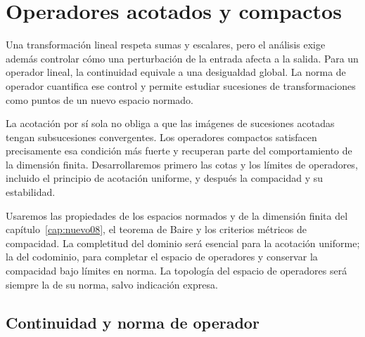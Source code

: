 \chapter{Operadores acotados y compactos}\label{cap:nuevo09}\label{chap:20}\label{chap:23}

Una transformación lineal respeta sumas y escalares, pero el análisis exige además controlar cómo una perturbación de la entrada afecta a la salida. Para un operador lineal, la continuidad equivale a una desigualdad global. La norma de operador cuantifica ese control y permite estudiar sucesiones de transformaciones como puntos de un nuevo espacio normado.

La acotación por sí sola no obliga a que las imágenes de sucesiones acotadas tengan subsucesiones convergentes. Los operadores compactos satisfacen precisamente esa condición más fuerte y recuperan parte del comportamiento de la dimensión finita. Desarrollaremos primero las cotas y los límites de operadores, incluido el principio de acotación uniforme, y después la compacidad y su estabilidad.

Usaremos las propiedades de los espacios normados y de la dimensión finita del capítulo~\ref{cap:nuevo08}, el teorema de Baire y los criterios métricos de compacidad. La completitud del dominio será esencial para la acotación uniforme; la del codominio, para completar el espacio de operadores y conservar la compacidad bajo límites en norma. La topología del espacio de operadores será siempre la de su norma, salvo indicación expresa.

\section{Continuidad y norma de operador}\label{lectura:20}

